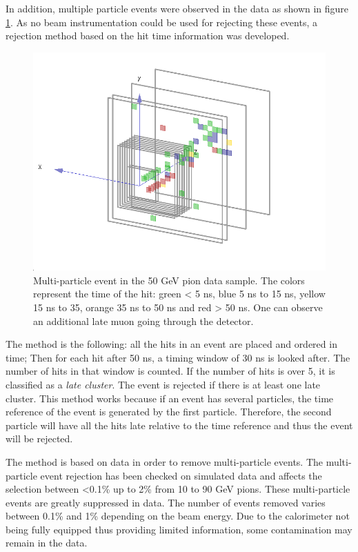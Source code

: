 In addition, multiple particle events were observed in the data as shown in figure \ref{fig:DoubleParticleEvent}. As no beam instrumentation could be used for rejecting these events, a rejection method based on the hit time information was developed.

\begin{figure}[htbp!]
	\centering
	\includegraphics[width=0.7\linewidth]{chap5/fig_AHCAL_timing/Pions/DoubleParticleEventPions.png}
	\caption{Multi-particle event in the 50 GeV pion data sample. The colors represent the time of the hit: green < 5 ns, blue 5 ns to 15 ns, yellow 15 ns to 35, orange 35 ns to 50 ns and red > 50 ns. One can observe an additional late muon going through the detector.} \label{fig:DoubleParticleEvent}
\end{figure}

The method is the following: all the hits in an event are placed and ordered in time; Then for each hit after 50 ns, a timing window of 30 ns is looked after. The number of hits in that window is counted. If the number of hits is over 5, it is classified as a \textit{late cluster}. The event is rejected if there is at least one late cluster. This method works because if an event has several particles, the time reference of the event is generated by the first particle. Therefore, the second particle will have all the hits late relative to the time reference and thus the event will be rejected.

The method is based on data in order to remove multi-particle events. The multi-particle event rejection has been checked on simulated data and affects the selection between <0.1\% up to 2\% from 10 to 90 GeV pions. These multi-particle events are greatly suppressed in data. The number of events removed varies between 0.1\% and 1\% depending on the beam energy. Due to the calorimeter not being fully equipped thus providing limited information, some contamination may remain in the data.

